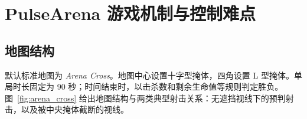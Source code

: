 \documentclass[UTF8,a4paper,11pt]{ctexart}
\begin{document}
\section{PulseArena 游戏机制与控制难点}

\subsection{地图结构}
默认标准地图为 \textit{Arena Cross}。地图中心设置十字型掩体，四角设置 L 型掩体。单局时长固定为 90 秒；时间结束时，以击杀数和剩余生命值等规则判定胜负。图~\ref{fig:arena_cross} 给出地图结构与两类典型射击关系：无遮挡视线下的预判射击，以及被中央掩体截断的视线。
\end{document}
